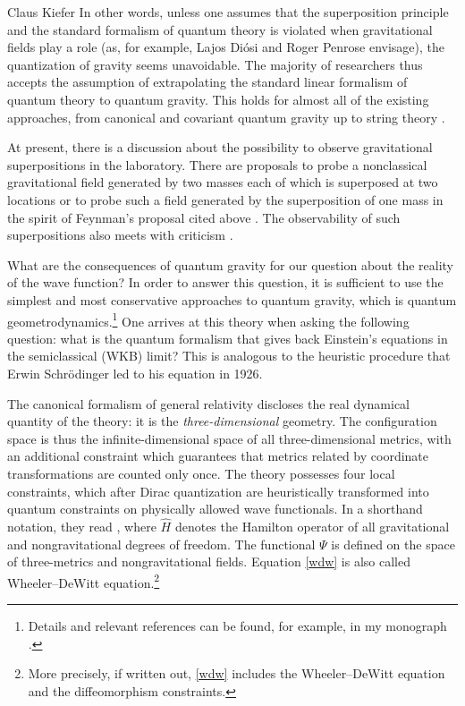 \begin{artengenv}{Claus Kiefer}
In other words, unless one assumes that the superposition principle
and the standard formalism of quantum theory is violated when
gravitational fields play a role (as, for example, Lajos Di\'osi and
Roger Penrose 
envisage), the quantization of gravity seems unavoidable. The majority
of researchers thus accepts the assumption of 
extrapolating the standard linear formalism of quantum theory to
quantum gravity. This holds for almost all of the existing approaches,
from canonical and covariant quantum gravity up to string theory
\parencite{kiefer_quantum_2012}.

At present, there is a discussion about the possibility to observe
gravitational superpositions in the laboratory. There are proposals
to probe a nonclassical gravitational field generated by
two masses each of which is superposed at two locations
\parencite[see e.g.][]{marletto_witness_2017}
or to probe such a field generated by the superposition
of one mass in the spirit of Feynman's proposal cited above
\parencite[see e.g. the remarks in][]{schmole_micromechanical_2016}.
The
observability of such superpositions also meets with criticism 
\parencite{anastopoulos_comment_2018}.

What are the consequences of quantum gravity for our question about the
reality of the wave function? In order to answer this question, it is
sufficient to use the simplest and most conservative approaches to
quantum gravity, which is quantum geometrodynamics.\footnote{Details
  and relevant references can be found, for example, in my monograph
  \parencite{kiefer_quantum_2012}.} One arrives at this theory when asking the
following question: what is the quantum formalism that gives back
Einstein's equations in the semiclassical (WKB) limit? This is analogous
to the heuristic procedure that Erwin Schr\"odinger led to his
equation in 1926.

The canonical formalism of general relativity discloses the real
dynamical quantity of the theory: it is the {\em three-dimensional}
geometry. The configuration space is thus the infinite-dimensional
space of all three-dimensional metrics, with an additional constraint
which guarantees that metrics related by coordinate transformations are
counted only once. The theory possesses four local constraints, which
after Dirac quantization are heuristically transformed into quantum
constraints on physically allowed wave functionals. 
In a shorthand notation, they read
\be
\label {wdw}
,
\ee
where $\hat{H}$ denotes the Hamilton operator of all gravitational and
nongravitational degrees of freedom. The functional $\Psi$ is defined
on the space of three-metrics and nongravitational fields. Equation
\eqref{wdw} is also called Wheeler--DeWitt equation.\footnote{More
  precisely, if written out, \eqref{wdw} includes the Wheeler--DeWitt
  equation and the diffeomorphism constraints.} 


\end{artengenv}
